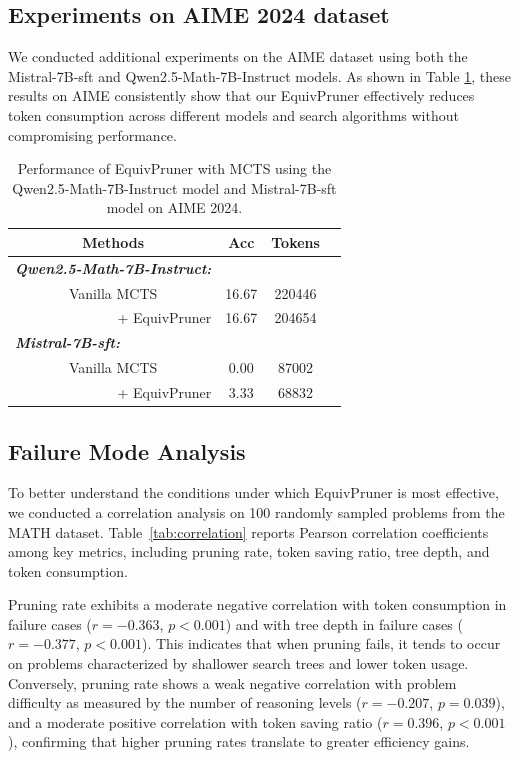 \documentclass[11pt]{article}
\begin{document}
\subsection{Experiments on AIME 2024 dataset}
\label{app:aime}
We conducted additional experiments on the AIME dataset using both the Mistral-7B-sft and Qwen2.5-Math-7B-Instruct models. As shown in Table \ref{tab:aime}, these results on AIME consistently show that our EquivPruner effectively reduces token consumption across different models and search algorithms without compromising performance.
\begin{table}[ht]
\centering
\caption{Performance of EquivPruner with MCTS using the Qwen2.5-Math-7B-Instruct model and Mistral-7B-sft model on AIME 2024.}
\label{tab:aime}
\begin{tabular}{cccc}
\hline
Methods                                      & Acc   & Tokens     \\ \hline
\multicolumn{1}{l}{\textit{\textbf{Qwen2.5-Math-7B-Instruct:}}}  &       &        \\
Vanilla MCTS                       & 16.67 & 220446   \\
\multicolumn{1}{r}{+ EquivPruner}            & 16.67 & 204654    \\ \hline
\multicolumn{1}{l}{\textit{\textbf{Mistral-7B-sft:}}} &       &        \\
Vanilla MCTS                       & 0.00 & 87002   \\
\multicolumn{1}{r}{+ EquivPruner}            & 3.33 & 68832     \\ \hline
\end{tabular}
\end{table}
\subsection{Failure Mode Analysis}
\label{fma}
To better understand the conditions under which EquivPruner is most effective, we conducted a correlation analysis on 100 randomly sampled problems from the MATH dataset. Table~\ref{tab:correlation} reports Pearson correlation coefficients among key metrics, including pruning rate, token saving ratio, tree depth, and token consumption.

Pruning rate exhibits a moderate negative correlation with token consumption in failure cases ($r = -0.363$, $p < 0.001$) and with tree depth in failure cases ($r = -0.377$, $p < 0.001$). This indicates that when pruning fails, it tends to occur on problems characterized by shallower search trees and lower token usage. Conversely, pruning rate shows a weak negative correlation with problem difficulty as measured by the number of reasoning levels ($r = -0.207$, $p = 0.039$), and a moderate positive correlation with token saving ratio ($r = 0.396$, $p < 0.001$), confirming that higher pruning rates translate to greater efficiency gains.
\end{document}
